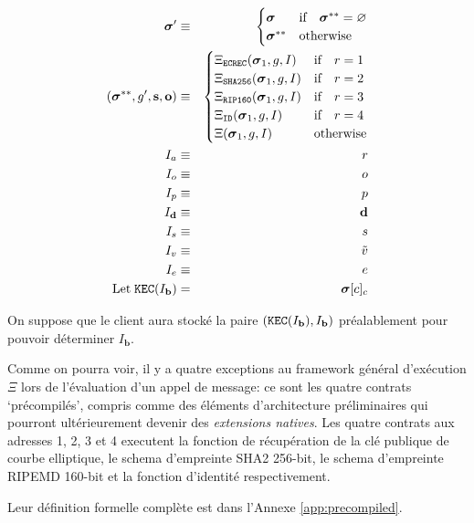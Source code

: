 \documentclass[9pt,oneside]{amsart}
\begin{document}
\begin{multicols}{2}
\begin{eqnarray}
\boldsymbol{\sigma}' & \equiv & \begin{cases}
\boldsymbol{\sigma} & \text{if} \quad \boldsymbol{\sigma}^{**} = \varnothing \\
\boldsymbol{\sigma}^{**} & \text{otherwise}
\end{cases} \\
(\boldsymbol{\sigma}^{**}, g', \mathbf{s}, \mathbf{o}) & \equiv & \begin{cases}
\Xi_{\mathtt{ECREC}}(\boldsymbol{\sigma}_1, g, I) & \text{if} \quad r = 1 \\
\Xi_{\mathtt{SHA256}}(\boldsymbol{\sigma}_1, g, I) & \text{if} \quad r = 2 \\
\Xi_{\mathtt{RIP160}}(\boldsymbol{\sigma}_1, g, I) & \text{if} \quad r = 3 \\
\Xi_{\mathtt{ID}}(\boldsymbol{\sigma}_1, g, I) & \text{if} \quad r = 4 \\
\Xi(\boldsymbol{\sigma}_1, g, I) & \text{otherwise} \end{cases} \\
I_a & \equiv & r \\
I_o & \equiv & o \\
I_p & \equiv & p \\
I_\mathbf{d} & \equiv & \mathbf{d} \\
I_s & \equiv & s \\
I_v & \equiv & \tilde{v} \\
I_e & \equiv & e \\
\text{Let} \; \mathtt{\tiny KEC}(I_\mathbf{b}) & = & \boldsymbol{\sigma}[c]_c
\end{eqnarray}

On suppose que le client aura stocké la paire $(\mathtt{\tiny KEC}(I_\mathbf{b}), I_\mathbf{b})$ préalablement pour pouvoir déterminer $I_\mathbf{b}$.

Comme on pourra voir, il y a quatre exceptions au framework général d'exécution $\Xi$ lors de l'évaluation d'un appel de message: ce sont les quatre contrats `précompilés', compris comme des éléments d'architecture préliminaires qui pourront ultérieurement devenir des \textit{extensions natives}. Les quatre contrats aux adresses 1, 2, 3 et 4 executent la fonction de récupération de la clé publique de courbe elliptique, le schema d'empreinte SHA2 256-bit, le schema d'empreinte RIPEMD 160-bit et la fonction d'identité respectivement.

Leur définition formelle complète est dans l'Annexe \ref{app:precompiled}.


\end{multicols}
\end{document}
